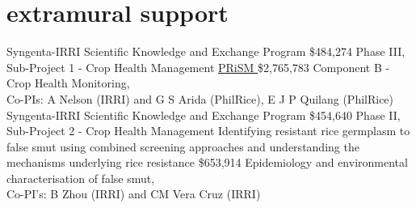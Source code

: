\section*{extramural support}
  \begin{entrylist}
	{Syngenta-IRRI Scientific Knowledge and Exchange Program}
	{\$484,274}
	{Phase III, Sub-Project 1 - Crop Health Management}
	{\href{http://philippinericeinfo.ph/}{PRiSM }}
	{\$2,765,783}
	{Component B - Crop Health Monitoring,\\Co-PIs: A Nelson (IRRI) and G S Arida (PhilRice), E J P Quilang (PhilRice)}
	{Syngenta-IRRI Scientific Knowledge and Exchange Program}
	{\$454,640}
	{Phase II, Sub-Project 2 - Crop Health Management}
    {Identifying resistant rice germplasm to false smut using combined screening approaches and understanding the mechanisms underlying rice resistance}
    {\$653,914}
    {Epidemiology and environmental characterisation of false smut,\\Co-PI's: B Zhou (IRRI) and CM Vera Cruz (IRRI)}
  \end{entrylist}

